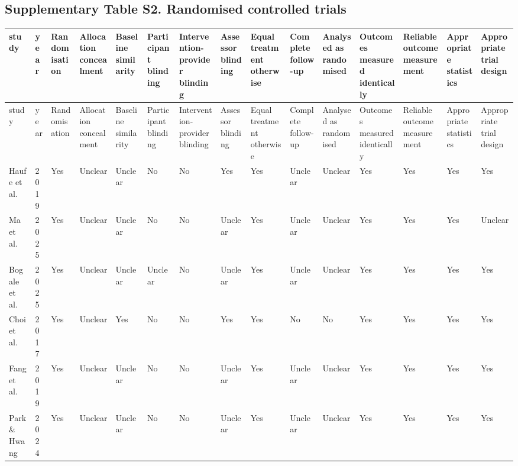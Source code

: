 \documentclass[10pt]{article}
\begin{document}
\subsection*{Supplementary Table S2. Randomised controlled trials}
\scriptsize
\begin{longtable}{p{} p{} p{} p{} p{} p{} p{} p{} p{} p{} p{} p{} p{} p{} p{}}
\toprule
study & year & Randomisation & Allocation concealment & Baseline similarity & Participant blinding & Intervention-provider blinding & Assessor blinding & Equal treatment otherwise & Complete follow-up & Analysed as randomised & Outcomes measured identically & Reliable outcome measurement & Appropriate statistics & Appropriate trial design \\
\midrule
\endfirsthead
\toprule
study & year & Randomisation & Allocation concealment & Baseline similarity & Participant blinding & Intervention-provider blinding & Assessor blinding & Equal treatment otherwise & Complete follow-up & Analysed as randomised & Outcomes measured identically & Reliable outcome measurement & Appropriate statistics & Appropriate trial design \\
\midrule
\endhead
Haufe et al. & 2019 & Yes & Unclear & Unclear & No & No & Yes & Yes & Unclear & Unclear & Yes & Yes & Yes & Yes \\
Ma et al. & 2025 & Yes & Unclear & Unclear & No & No & Unclear & Yes & Unclear & Unclear & Yes & Yes & Yes & Unclear \\
Bogale et al. & 2025 & Yes & Unclear & Unclear & Unclear & No & Unclear & Yes & Unclear & Unclear & Yes & Yes & Yes & Yes \\
Choi et al. & 2017 & Yes & Unclear & Yes & No & No & Yes & Yes & No & No & Yes & Yes & Yes & Yes \\
Fang et al. & 2019 & Yes & Unclear & Unclear & No & No & Unclear & Yes & Unclear & Unclear & Yes & Yes & Yes & Yes \\
Park \& Hwang & 2024 & Yes & Unclear & Unclear & No & No & Unclear & Yes & Unclear & Unclear & Yes & Yes & Yes & Yes \\
\bottomrule
\end{longtable}
\normalsize
\end{document}
